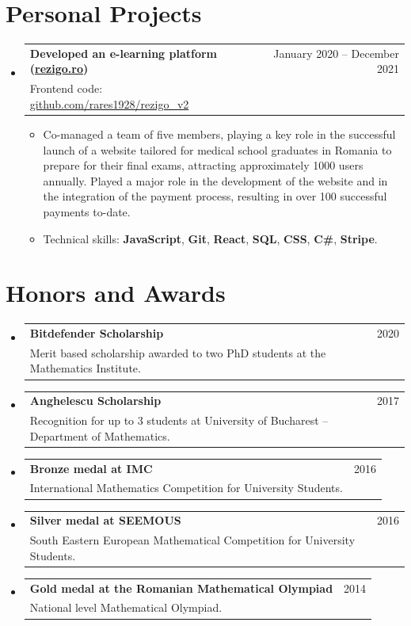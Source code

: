 \documentclass[a4paper, 11pt]{article}
\makeatletter
\newcommand{\CVItem}[1]{
  \item{
    {#1 \vspace{-2pt}}
  }
}
\newcommand{\CVSubheading}[4]{
  \vspace{-2pt}\item
    \begin{tabular*}{0.97\textwidth}[t]{l@{\extracolsep{\fill}}r}
      \textbf{#1} & #2 \\
      #3 & \ #4 \\
    \end{tabular*}\vspace{-7pt}
}
\newcommand{\CVSubHeadingListStart}{\begin{itemize}[leftmargin=0.5cm, label={}]}
\newcommand{\CVSubHeadingListEnd}{\end{itemize}}
\newcommand{\CVItemListStart}{\begin{itemize}}
\newcommand{\CVItemListEnd}{\end{itemize}\vspace{-5pt}}
\makeatother
\begin{document}
\section{Personal Projects}
  \CVSubHeadingListStart
    \CVSubheading
      {Developed an e-learning platform (\href{https://rezigo.ro}{rezigo.ro})}{January 2020 -- December 2021}
		{Frontend code: \href{https://github.com/rares1928/rezigo_v2}{github.com/rares1928/rezigo\_v2}}{}
      \CVItemListStart
      \CVItem{Co-managed a team of five members, playing a key role in the successful launch of a website tailored for medical school graduates in Romania to prepare for their final exams, attracting approximately 1000 users annually. Played a major role in the development of the website and in the integration of the payment process, resulting in over 100 successful payments to-date.}
      \CVItem{Technical skills: \textbf{JavaScript}, \textbf{Git}, \textbf{React}, \textbf{SQL}, \textbf{CSS}, \textbf{C\#}, \textbf{Stripe}.}
      \CVItemListEnd
  \CVSubHeadingListEnd


\section{Honors and Awards}
  \CVSubHeadingListStart
    \CVSubheading
      {Bitdefender Scholarship}{2020}
      {Merit based scholarship awarded to two PhD students at the Mathematics Institute.}{}
      \CVSubheading
      {Anghelescu Scholarship}{2017}
      {Recognition for up to 3 students at University of Bucharest -- Department of Mathematics.}{}
      \CVSubheading
      {Bronze medal at IMC}{2016}
      {International Mathematics Competition
for University Students.}{}
    \CVSubheading
      {Silver medal at SEEMOUS}{2016}
      {South Eastern European Mathematical Competition for University Students.}{}
    \CVSubheading
      {Gold medal at the Romanian Mathematical Olympiad}{2014}
      {National level Mathematical Olympiad.}{}

  \CVSubHeadingListEnd

\end{document}
